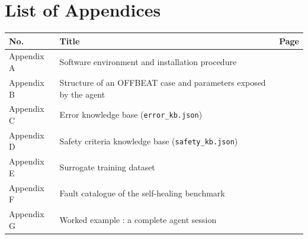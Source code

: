 \renewcommand{\listfigurename}{List of Figures}
\listoffigures
{}
\clearpage

\renewcommand{\listtablename}{List of Tables}
\listoftables
{}
\clearpage

\chapter*{List of Appendices}
\noindent
\begin{tabularx}{\textwidth}{@{}lXr@{}}
\toprule
\textbf{No.} & \textbf{Title} & \textbf{Page}\\
\midrule
Appendix A & Software environment and installation procedure
           & \pageref{ann:install}\\
Appendix B & Structure of an OFFBEAT case and parameters exposed by the agent
           & \pageref{ann:cas}\\
Appendix C & Error knowledge base (\texttt{error\_kb.json})
           & \pageref{ann:errkb}\\
Appendix D & Safety criteria knowledge base (\texttt{safety\_kb.json})
           & \pageref{ann:safetykb}\\
Appendix E & Surrogate training dataset & \pageref{ann:dataset}\\
Appendix F & Fault catalogue of the self-healing benchmark
           & \pageref{ann:bench}\\
Appendix G & Worked example : a complete agent session
           & \pageref{ann:session}\\
\bottomrule
\end{tabularx}

\clearpage
